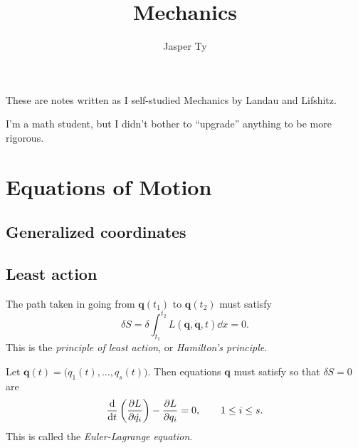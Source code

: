 \documentclass{article}
\title{Mechanics}
\author{Jasper Ty}
\date{}
\begin{document}
\maketitle

These are notes written as I self-studied Mechanics by Landau and Lifshitz.

I'm a math student, but I didn't bother to ``upgrade'' anything to be more rigorous.

\tableofcontents

\section{Equations of Motion}

\subsection{Generalized coordinates}
\subsection{Least action}

\begin{definition}
    The path taken in going from $\mathbf{q}(t_1)$ to $\mathbf{q}(t_2)$ must satisfy
    \[
        \delta S = \delta \int_{t_1}^{t_2} L(\mathbf{q},\dot{\mathbf{q}},t)\dd x = 0.
    \]
    This is the \textit{principle of least action}, or \textit{Hamilton's principle}.
\end{definition}

\begin{theorem}
    Let $\mathbf{q}(t) = \big(q_1(t), \ldots, q_s(t)\big)$.
    Then equations $\mathbf{q}$ must satisfy so that $\delta S = 0$ are
    \[
        \dv{t} \left(\pdv{L}{\dot{q_i}}\right) - \pdv{L}{q_i} = 0, \qquad 1 \leq i \leq s.
    \]
    This is called the \textit{Euler-Lagrange equation}.
\end{theorem}
\end{document}
